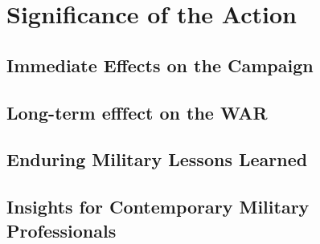\section{Significance of the Action}

\subsection{Immediate Effects on the Campaign}

\subsection{Long-term efffect on the WAR}

\subsection{Enduring Military Lessons Learned}

\subsection{Insights for Contemporary Military Professionals}

